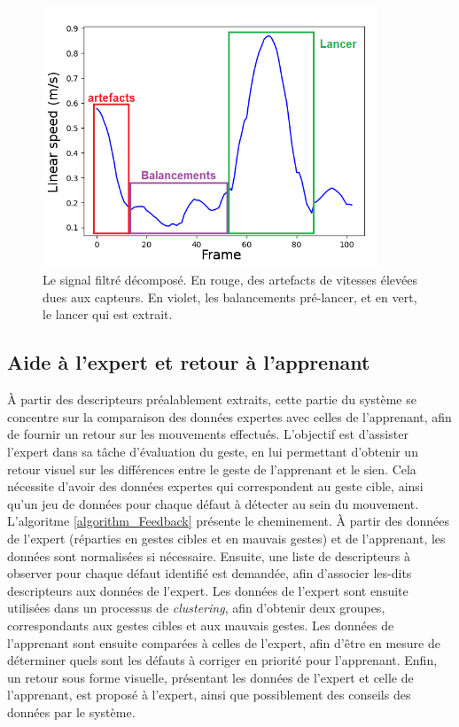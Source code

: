 \begin{figure}
	\centering
    \includegraphics[width=10cm]{pictures/after_savgol_explained.png}
    \caption[Signal filtré décomposé en trois étapes]{Le signal filtré décomposé. En rouge, des artefacts de vitesses élevées dues aux capteurs. En violet, les balancements pré-lancer, et en vert, le lancer qui est extrait.}
    \label{fig:after_savgol_explained}
\end{figure}

\subsection{Aide à l'expert et retour à l'apprenant}\label{subsec:feedback}
À partir des descripteurs préalablement extraits, cette partie du système se concentre sur la comparaison des données expertes avec celles de l'apprenant, afin de fournir un retour sur les mouvements effectués. L'objectif est d'assister l'expert dans sa tâche d'évaluation du geste, en lui permettant d'obtenir un retour visuel sur les différences entre le geste de l'apprenant et le sien. Cela nécessite d'avoir des données expertes qui correspondent au geste cible, ainsi qu'un jeu de données pour chaque défaut à détecter au sein du mouvement. L'algoritme \ref{algorithm_Feedback} présente le cheminement. À partir des données de l'expert (réparties en gestes cibles et en mauvais gestes) et de l'apprenant, les données sont normalisées si nécessaire. Ensuite, une liste de descripteurs à observer pour chaque défaut identifié est demandée, afin d'associer les-dits descripteurs aux données de l'expert. Les données de l'expert sont ensuite utilisées dans un processus de \textit{clustering}, afin d'obtenir deux groupes, correspondants aux gestes cibles et aux mauvais gestes. Les données de l'apprenant sont ensuite comparées à celles de l'expert, afin d'être en mesure de déterminer quels sont les défauts à corriger en priorité pour l'apprenant. Enfin, un retour sous forme visuelle, présentant les données de l'expert et celle de l'apprenant, est proposé à l'expert, ainsi que possiblement des conseils des données par le système.

